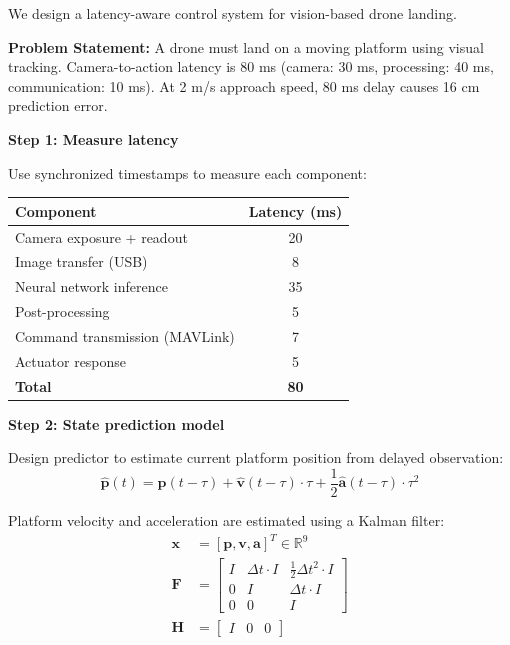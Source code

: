 \begin{example}
\label{ex:handling_latency}
We design a latency-aware control system for vision-based drone landing.

\textbf{Problem Statement:}
A drone must land on a moving platform using visual tracking. Camera-to-action latency is 80 ms (camera: 30 ms, processing: 40 ms, communication: 10 ms). At 2 m/s approach speed, 80 ms delay causes 16 cm prediction error.

\textbf{Step 1: Measure latency}

Use synchronized timestamps to measure each component:

\begin{center}
\begin{tabular}{lc}
\toprule
\textbf{Component} & \textbf{Latency (ms)} \\
\midrule
Camera exposure + readout & 20 \\
Image transfer (USB) & 8 \\
Neural network inference & 35 \\
Post-processing & 5 \\
Command transmission (MAVLink) & 7 \\
Actuator response & 5 \\
\midrule
\textbf{Total} & \textbf{80} \\
\bottomrule
\end{tabular}
\end{center}

\textbf{Step 2: State prediction model}

Design predictor to estimate current platform position from delayed observation:
\begin{equation}
\hat{\mathbf{p}}(t) = \mathbf{p}(t - \tau) + \hat{\mathbf{v}}(t - \tau) \cdot \tau + \frac{1}{2}\hat{\mathbf{a}}(t - \tau) \cdot \tau^2
\end{equation}

Platform velocity and acceleration are estimated using a Kalman filter:
\begin{align}
\mathbf{x} &= [\mathbf{p}, \mathbf{v}, \mathbf{a}]^T \in \mathbb{R}^9 \\
\mathbf{F} &= \begin{bmatrix} I & \Delta t \cdot I & \frac{1}{2}\Delta t^2 \cdot I \\ 0 & I & \Delta t \cdot I \\ 0 & 0 & I \end{bmatrix} \\
\mathbf{H} &= \begin{bmatrix} I & 0 & 0 \end{bmatrix}
\end{align}


\end{example}
